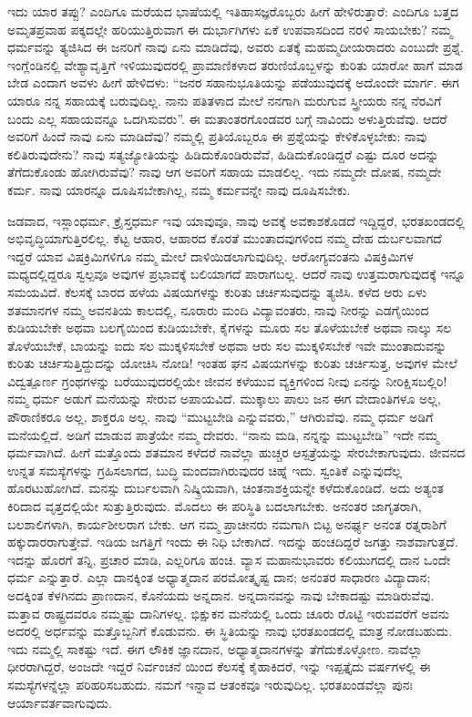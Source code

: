 ಇದು ಯಾರ ತಪ್ಪು? ಎಂದಿಗೂ ಮರೆಯದ ಭಾಷೆಯಲ್ಲಿ ಇತಿಹಾಸಜ್ಞ\-ರೊಬ್ಬರು ಹೀಗೆ ಹೇಳಿರುತ್ತಾರೆ: ಎಂದಿಗೂ ಬತ್ತದ ಅಮೃತಪ್ರವಾಹ ಪಕ್ಕದಲ್ಲೇ ಹರಿಯುತ್ತಿರುವಾಗ ಈ ದುರ್ಭಾಗಿಗಳು ಏಕೆ ಉಪವಾಸದಿಂದ ನರಳಿ ಸಾಯಬೇಕು? ನಮ್ಮ ಧರ್ಮವನ್ನು ತ್ಯಜಿಸಿದ ಈ ಜನರಿಗೆ ನಾವು ಏನು ಮಾಡಿದೆವು, ಅವರು ಏತಕ್ಕೆ ಮಹಮ್ಮದೀಯರಾದರು ಎಂಬುದೇ ಪ್ರಶ್ನೆ. ಇಂಗ್ಲೆಂಡಿನಲ್ಲಿ ವೇಶ್ಯಾವೃತ್ತಿಗೆ ಇಳಿಯುವುದರಲ್ಲಿ ಪ್ರಾಮಾಣಿಕಳಾದ ತರುಣಿಯೊಬ್ಬಳನ್ನು ಕುರಿತು ಯಾರೋ ಹಾಗೆ ಮಾಡ ಬೇಡ ಎಂದಾಗ ಅವಳು ಹೀಗೆ ಹೇಳಿದಳು: “ಜನರ ಸಹಾನು\-ಭೂತಿಯನ್ನು ಪಡೆಯುವುದಕ್ಕೆ ಅದೊಂದೇ ಮಾರ್ಗ. ಈಗ ಯಾರೂ ನನ್ನ ಸಹಾಯಕ್ಕೆ ಬರುವುದಿಲ್ಲ. ನಾನು ಪತಿತಳಾದ ಮೇಲೆ ನನಗಾಗಿ ಮರುಗುವ ಸ್ತ್ರೀಯರು ನನ್ನ ನೆರವಿಗೆ ಬಂದು ಎಲ್ಲ ಸಹಾಯವನ್ನೂ ಒದಗಿಸುವರು”. ಈ ಮತಾಂತರಗೊಂಡವರ ಬಗ್ಗೆ ನಾವಿಂದು ಅಳುತ್ತಿರುವೆವು. ಆದರೆ ಅವರಿಗೆ ಹಿಂದೆ ನಾವು ಏನು ಮಾಡಿದೆವು? ನಮ್ಮಲ್ಲಿ ಪ್ರತಿಯೊಬ್ಬರೂ ಈ ಪ್ರಶ್ನೆಯನ್ನು ಕೇಳಿಕೊಳ್ಳಬೇಕು: ನಾವು ಕಲಿತಿರುವುದೇನು? ನಾವು ಸತ್ಯಜ್ಯೋತಿಯನ್ನು ಹಿಡಿದುಕೊಂಡಿರುವೆವೆ, ಹಿಡಿದುಕೊಂಡಿದ್ದರೆ ಎಷ್ಟು ದೂರ ಅದನ್ನು ತೆಗೆದುಕೊಂಡು ಹೋಗಿರುವೆವು? ನಾವು ಆಗ ಅವರಿಗೆ ಸಹಾಯ ಮಾಡಲಿಲ್ಲ. ಇದು ನಮ್ಮದೇ ದೋಷ, ನಮ್ಮದೇ ಕರ್ಮ. ನಾವು ಯಾರನ್ನೂ ದೂಷಿಸಬೇಕಾಗಿಲ್ಲ, ನಮ್ಮ ಕರ್ಮವನ್ನೇ ನಾವು ದೂಷಿಸಬೇಕು. 

ಜಡವಾದ, ಇಸ್ಲಾಂಧರ್ಮ, ಕ್ರೈಸ್ತಧರ್ಮ ಇವು ಯಾವುವೂ, ನಾವು ಅವಕ್ಕೆ ಅವಕಾಶಕೊಡದೆ ಇದ್ದಿದ್ದರೆ, ಭರತಖಂಡದಲ್ಲಿ ಅಭಿವೃದ್ಧಿಯಾಗುತ್ತಿರಲಿಲ್ಲ. ಕೆಟ್ಟ ಆಹಾರ, ಆಹಾರದ ಕೊರತೆ ಮುಂತಾದವುಗಳಿಂದ ನಮ್ಮ ದೇಹ ದುರ್ಬಲವಾಗದೆ ಇದ್ದರೆ ಯಾವ ವಿಷಕ್ರಿಮಿಗಳಿಗೂ ನಮ್ಮ ಮೇಲೆ ದಾಳಿಯಿಡಲಾಗುವುದಿಲ್ಲ. ಆರೋಗ್ಯವಂತನು ವಿಷಕ್ರಿಮಿಗಳ ಮಧ್ಯದಲ್ಲಿದ್ದರೂ ಸ್ವಲ್ಪವೂ ಅವುಗಳ ಪ್ರಭಾವಕ್ಕೆ ಬಲಿಯಾಗದೆ ಪಾರಾಗಬಲ್ಲ. ಆದರೆ ನಾವು ಉತ್ತಮರಾಗುವುದಕ್ಕೆ ಇನ್ನೂ ಸಮಯವಿದೆ. ಕೆಲಸಕ್ಕೆ ಬಾರದ ಹಳೆಯ ವಿಷಯಗಳನ್ನು ಕುರಿತು ಚರ್ಚಿಸುವುದನ್ನು ತ್ಯಜಿಸಿ. ಕಳೆದ ಆರು ಏಳು ಶತಮಾನಗಳ ನಮ್ಮ ಅವನತಿಯ ಕಾಲದಲ್ಲಿ, ನೂರಾರು ಮಂದಿ ವಿದ್ಯಾವಂತರು, ನಾವು ನೀರನ್ನು ಎಡಗೈಯಿಂದ ಕುಡಿಯಬೇಕೇ ಅಥವಾ ಬಲಗೈಯಿಂದ ಕುಡಿಯಬೇಕೇ, ಕೈಗಳನ್ನು ಮೂರು ಸಲ ತೊಳೆಯಬೇಕೆ ಅಥವಾ ನಾಲ್ಕು ಸಲ ತೊಳೆಯಬೇಕೆ, ಬಾಯನ್ನು ಐದು ಸಲ ಮುಕ್ಕಳಿಸಬೇಕೆ ಅಥವಾ ಆರು ಸಲ ಮುಕ್ಕಳಿಸಬೇಕೆ ಇವೇ ಮುಂತಾದುವನ್ನು ಕುರಿತು ಚರ್ಚಿಸುತ್ತಿದ್ದುದನ್ನು ಯೋಚಿಸಿ ನೋಡಿ! ಇಂತಹ ಘನ ವಿಷಯಗಳನ್ನು ಕುರಿತು ಚರ್ಚಿಸುತ್ತ, ಅವುಗಳ ಮೇಲೆ ವಿದ್ವತ್ಪೂರ್ಣ ಗ್ರಂಥಗಳನ್ನು ಬರೆಯುವುದರಲ್ಲಿಯೇ ಜೀವನ ಕಳೆಯುವ ವ್ಯಕ್ತಿಗಳಿಂದ ನೀವು ಏನನ್ನು ನೀರಿಕ್ಷಿಸಬಲ್ಲಿರಿ! ನಮ್ಮ ಧರ್ಮ ಅಡುಗೆ ಮನೆಯನ್ನು ಸೇರುವ ಅಪಾಯವಿದೆ. ಮುಕ್ಕಾಲು ಪಾಲು ಜನ ಈಗ ವೇದಾಂತಿಗಳೂ ಅಲ್ಲ, ಪೌರಾಣಿಕರೂ ಅಲ್ಲ, ಶಾಕ್ತರೂ ಅಲ್ಲ. ನಾವು “ಮುಟ್ಟಬೇಡಿ ಎನ್ನುವವರು,” ಆಗಿರುವೆವು. ನಮ್ಮ ಧರ್ಮ ಅಡಿಗೆ ಮನೆಯಲ್ಲಿದೆ. ಅಡಿಗೆ ಮಾಡುವ ಪಾತ್ರೆಯೇ ನಮ್ಮ ದೇವರು. “ನಾನು ಮಡಿ, ನನ್ನನ್ನು ಮುಟ್ಟಬೇಡಿ” ಇದೇ ನಮ್ಮ ಧರ್ಮವಾಗಿದೆ. ಹೀಗೆ ಮತ್ತೊಂದು ಶತಮಾನ ಕಳೆದರೆ ನಾವೆಲ್ಲಾ ಹುಚ್ಚರ ಆಸ್ಪತ್ರೆಯನ್ನು ಸೇರಬೇಕಾಗುವುದು. ಜೀವನದ ಉನ್ನತ ಸಮಸ್ಯೆಗಳನ್ನು ಗ್ರಹಿಸಲಾಗದ, ಬುದ್ಧಿ ಮಂದವಾಗಿರುವುದರ ಚಿಹ್ನೆ ಇದು. ಸ್ವಂತಿಕೆ ಎನ್ನುವುದೆಲ್ಲ ಹೊರಟುಹೋಗಿದೆ. ಮನಸ್ಸು ದುರ್ಬಲವಾಗಿ ನಿಷ್ಕ್ರಿಯವಾಗಿ, ಚಿಂತನಾಶಕ್ತಿಯನ್ನೇ ಕಳೆದುಕೊಂಡಿದೆ. ಅದು ಅತ್ಯಂತ ಕಿರಿದಾದ ವೃತ್ತದಲ್ಲಿಯೇ ಸುತ್ತುತ್ತಿರುವುದು. ಮೊದಲು ಈ ಪರಿಸ್ಥಿತಿ ಬದಲಾಗಬೇಕು. ಅನಂತರ ಜಾಗೃತರಾಗಿ, ಬಲಶಾಲಿಗಳಾಗಿ, ಕಾರ್ಯಶೀಲರಾಗ ಬೇಕು. ಆಗ ನಮ್ಮ ಪ್ರಾಚೀನರು ನಮಗಾಗಿ ಬಿಟ್ಟ ಅನರ್ಘ್ಯ ಅನಂತ ರತ್ನರಾಶಿಗೆ ಹಕ್ಕುದಾರರಾಗುತ್ತೇವೆ. ಇಡಿಯ ಜಗತ್ತಿಗೆ ಇಂದು ಈ ನಿಧಿ ಬೇಕಾಗಿದೆ. ಇದನ್ನು ಹಂಚದಿದ್ದರೆ ಜಗತ್ತು ನಾಶವಾಗುತ್ತದೆ. ಇದನ್ನು ಹೊರಗೆ ತನ್ನಿ, ಪ್ರಚಾರ ಮಾಡಿ, ಎಲ್ಲರಿಗೂ ಹಂಚಿ. ವ್ಯಾಸ ಮಹಾನುಭಾವರು ಕಲಿಯುಗದಲ್ಲಿ ದಾನ ಒಂದೇ ಧರ್ಮ ಎನ್ನುತ್ತಾರೆ. ಎಲ್ಲಾ ದಾನಕ್ಕಿಂತ ಅಧ್ಯಾತ್ಮದಾನ ಪರಮೋತ್ಕೃಷ್ಟ ದಾನ; ಅನಂತರ ಸಾಧಾರಣ ವಿದ್ಯಾದಾನ; ಅದಕ್ಕಿಂತ ಕೆಳಗಿನದು ಪ್ರಾಣದಾನ, ಕೊನೆಯದು ಅನ್ನದಾನ. ಅನ್ನದಾನವನ್ನು ನಾವು ಬೇಕಾದಷ್ಟು ಮಾಡಿರುವೆವು. ಮತ್ತಾವ ರಾಷ್ಟ್ರದವರೂ ನಮ್ಮಷ್ಟು ದಾನಿಗಳಲ್ಲ. ಭಿಕ್ಷುಕನ ಮನೆಯಲ್ಲಿ ಒಂದು ಚೂರು ರೊಟ್ಟಿ ಇರುವವರೆಗೆ ಅವನು ಅದರಲ್ಲಿ ಅರ್ಧವನ್ನು ಮತ್ತೊಬ್ಬನಿಗೆ ಕೊಡುವನು. ಈ ಸ್ಥಿತಿಯನ್ನು ನಾವು ಭರತಖಂಡದಲ್ಲಿ ಮಾತ್ರ ನೋಡಬಹುದು. ಇದು ನಮ್ಮಲ್ಲಿ ಸಾಕಷ್ಟು ಇದೆ. ಈಗ ಲೌಕಿಕ ಜ್ಞಾನದಾನ, ಅಧ್ಯಾತ್ಮ\-ದಾನಗಳನ್ನು ತೆಗೆದುಕೊಳ್ಳೋಣ. ನಾವೆಲ್ಲಾ ಧೀರರಾಗಿದ್ದರೆ, ಅಂಜದೇ ಇದ್ದರೆ ನಿರ್ವಂಚನೆ ಯಿಂದ ಕೆಲಸಕ್ಕೆ ಕೈಹಾಕಿದರೆ, ಇನ್ನು ಇಪ್ಪತ್ತೈದು ವರ್ಷಗಳಲ್ಲಿ ಈ ಸಮಸ್ಯೆಗಳನ್ನೆಲ್ಲಾ ಪರಿಹರಿಸಬಹುದು. ನಮಗೆ ಇನ್ನಾವ ಆತಂಕವೂ ಇರುವುದಿಲ್ಲ. ಭರತಖಂಡವೆಲ್ಲಾ ಪುನಃ ಆರ್ಯಾವರ್ತವಾಗುವುದು. 

